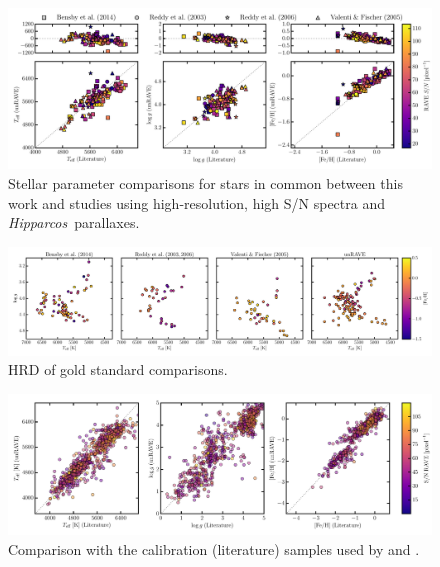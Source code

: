 \documentclass[preprint,trackchanges]{aastex}
\newcommand{\project}[1]{\textsl{#1}}
\newcommand{\hipparcos}{\project{Hipparcos}}
\begin{document}
\begin{figure}[p]
\includegraphics[width=\textwidth]{figures/gold-standard-comparison.pdf}
\caption{Stellar parameter comparisons for stars in common between this work and studies using high-resolution, high S/N spectra and \hipparcos\ parallaxes.\label{fig:gold-standard-comparison}}
\end{figure}

\begin{figure}[p]
\includegraphics[width=\textwidth]{figures/gold-standard-hrd.pdf}
\caption{HRD of gold standard comparisons.\label{fig:gold-standard-hrd}}
\end{figure}


\begin{figure}[p]
\includegraphics[width=\textwidth]{figures/kordopatis-calibration.pdf}
\caption{Comparison with the calibration (literature) samples used by \citet{Kordopatis_2013} and \citet{Kunder_2016}.\label{fig:kordopatis-calibration}}
\end{figure}
\end{document}
